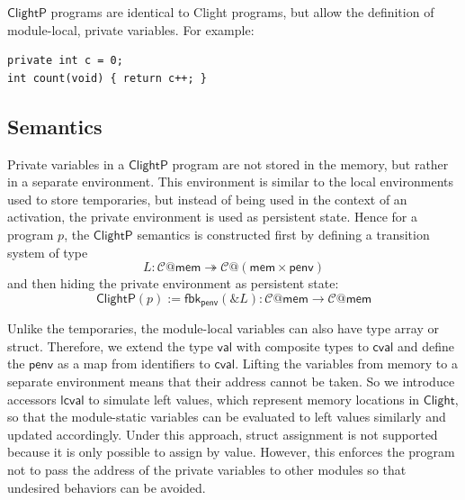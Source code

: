 \documentclass[acmsmall,screen,review,anonymous]{acmart}
\newcommand{\kw}[1]{\ensuremath{ \mathsf{#1} }}
\newcommand{\ClightP}{\ensuremath{ \mathsf{ClightP} }}
\newcommand{\Clight}{\ensuremath{ \mathsf{Clight} }}
\begin{document}
\ClightP{} programs are identical to Clight programs,
but allow the definition of module-local, private variables.
For example:

\begin{verbatim}
private int c = 0;
int count(void) { return c++; }
\end{verbatim}


\subsection{Semantics} %

Private variables in a \ClightP{} program
are not stored in the memory,
but rather in a separate environment.
This environment is similar to
the local environments used to store temporaries,
but instead of being used in the context of an activation,
the private environment is used as persistent state.
Hence for a program $p$, the \ClightP{} semantics is constructed
first by defining a transition system of type
\[
  L : \mathcal{C}@\mathsf{mem} \twoheadrightarrow
      \mathcal{C}@(\mathsf{mem}\times\mathsf{penv})
\]
and then hiding the private environment as persistent state:
\[
  \ClightP{}(p) := \mathsf{fbk}_\mathsf{penv}(\&L) :
    \mathcal{C}@\mathsf{mem} \rightarrow
    \mathcal{C}@\mathsf{mem}
\]


Unlike the temporaries,
the module-local variables can also have type array or struct.
Therefore, we extend the type $\kw{val}$ with composite types to $\kw{cval}$
and define the $\kw{penv}$ as a map from identifiers to $\kw{cval}$.
Lifting the variables from memory to a separate environment
means that their address cannot be taken.
So we introduce accessors $\kw{lcval}$ to simulate left values,
which represent memory locations in $\Clight$,
so that the module-static variables can be evaluated to left values similarly
and updated accordingly.
Under this approach, struct assignment is not supported
because it is only possible to assign by value.
However, this enforces the program not to pass the address
of the private variables to other modules
so that undesired behaviors can be avoided.
\end{document}
